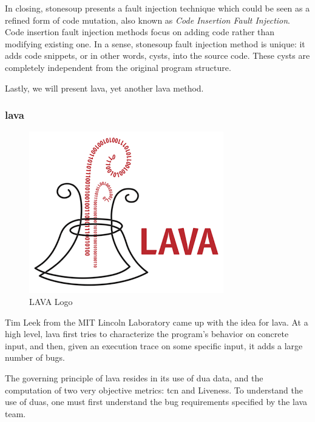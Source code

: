 \vspace{1.5cm}

In closing, \gls{stonesoup} presents a fault injection technique which could be seen as a refined form of code mutation, also known as \emph{Code Insertion Fault Injection}. Code insertion fault injection methods focus on adding code rather than modifying existing one. In a sense, \gls{stonesoup} fault injection method is unique: it adds code snippets, or in other words, cysts, into the source code. These cysts are completely independent from the original program structure.

Lastly, we will present \gls{lava}, yet another \acrlong{lava} method.

\clearpage

\subsubsection{\acrfull{lava}}
\label{sec:lava}

\begin{figure}[ht]
    \centering
    \includegraphics[scale=0.4]{figures/lava-logo}
    \caption{LAVA Logo \cite{dolan2016million}}
    \label{fig:lava-logo}
\end{figure}

\vspace{0.5cm}

Tim Leek from the MIT Lincoln Laboratory came up with  the idea for \gls{lava}. At a high level, \gls{lava} first tries to characterize the program's behavior on concrete input, and then, given an execution trace on some specific input, it adds a large number of bugs.

The governing principle of \gls{lava} resides in its use of \gls{dua} data, and the computation of two very objective metrics: \gls{tcn} and Liveness. To understand the use of \glspl{dua}, one must first understand the bug requirements specified by the \gls{lava} team.


